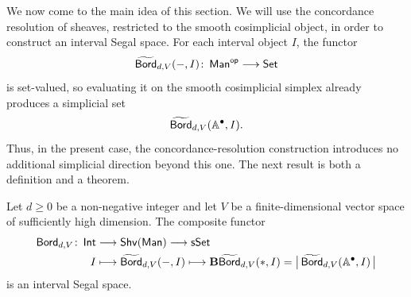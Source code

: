 We now come to the main idea of this section. We will use the concordance resolution of sheaves, restricted to the smooth cosimplicial object, in order to construct an interval Segal space. For each interval object $I$, the functor
\begin{equation}
    \widetilde{\operatorname{\mathsf{Bord}}}_{d,V}(-,I) \colon \operatorname{\sf Man}^{\mathsf{op}}\longrightarrow \mathsf{Set}
\end{equation}
is set-valued, so evaluating it on the smooth cosimplicial simplex already produces a simplicial set
\begin{equation}
    \widetilde{\operatorname{\mathsf{Bord}}}_{d,V}(\mathbb A^\bullet,I).
\end{equation}
Thus, in the present case, the concordance-resolution construction introduces no additional simplicial direction beyond this one. The next result is both a definition and a theorem.

\medskip

\begin{theorem}\label{ch3:: thm: interval segal bordism cat}
    Let $d \geq 0$ be a non-negative integer and let $V$ be a finite-dimensional vector space of sufficiently high dimension. The composite functor
    \begin{align}
        \operatorname{\mathsf{Bord}}_{d,V} \colon \operatorname{\mathsf{Int}} &\longrightarrow \operatorname{\sf Shv}(\operatorname{\sf Man})  \longrightarrow \operatorname{\sf sSet}  \\
         I &\longmapsto \widetilde{\operatorname{\mathsf{Bord}}}_{d,V}(-,I) \longmapsto \mathbf B\widetilde{\operatorname{\mathsf{Bord}}}_{d,V}(*,I) = \big|\,\widetilde{\operatorname{\mathsf{Bord}}}_{d,V}(\mathbb A^\bullet,I)\,\big| 
    \end{align}
    is an interval Segal space.
\end{theorem}

\smallskip

